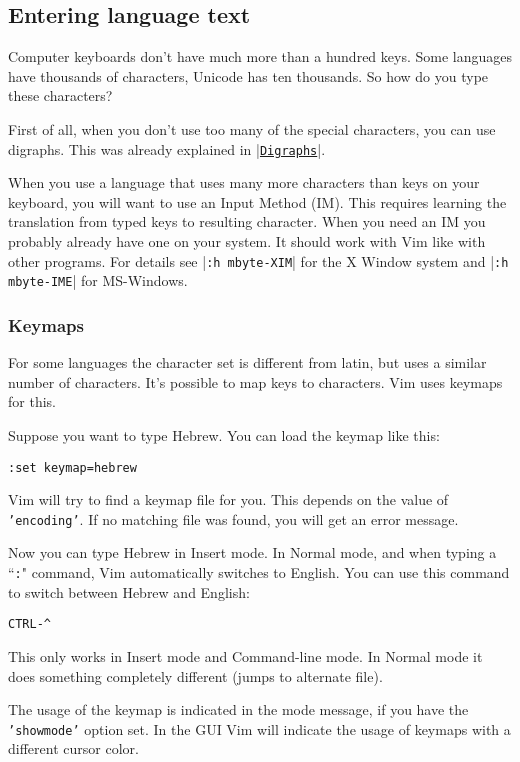 \subsection{Entering language text}
\label{Entering language text}
Computer keyboards don't have much more than a hundred keys.
Some languages have thousands of characters, Unicode has ten thousands.
So how do you type these characters?

First of all, when you don't use too many of the special characters, you can use digraphs.
This was already explained in |\hyperref[Digraphs]{\texttt{Digraphs}}|.

When you use a language that uses many more characters than keys on your keyboard, you will want to use an Input Method (IM).
This requires learning the translation from typed keys to resulting character.
When you need an IM you probably already have one on your system.
It should work with Vim like with other programs.
For details see |\texttt{:h mbyte-XIM}| for the X Window system and |\texttt{:h mbyte-IME}| for MS-Windows.

\subsubsection{Keymaps}
For some languages the character set is different from latin, but uses a similar number of characters.
It's possible to map keys to characters.
Vim uses keymaps for this.

Suppose you want to type Hebrew.
You can load the keymap like this:

\begin{Verbatim}[samepage=true]
 :set keymap=hebrew
\end{Verbatim}

Vim will try to find a keymap file for you.
This depends on the value of \texttt{'encoding'}.
If no matching file was found, you will get an error message.

Now you can type Hebrew in Insert mode.
In Normal mode, and when typing a ``\texttt{:}" command, Vim automatically switches to English.
You can use this command to switch between Hebrew and English:

\begin{Verbatim}[samepage=true]
 CTRL-^
\end{Verbatim}

This only works in Insert mode and Command-line mode.
In Normal mode it does something completely different (jumps to alternate file).

The usage of the keymap is indicated in the mode message, if you have the \texttt{'showmode'} option set.
In the GUI Vim will indicate the usage of keymaps with a different cursor color.

